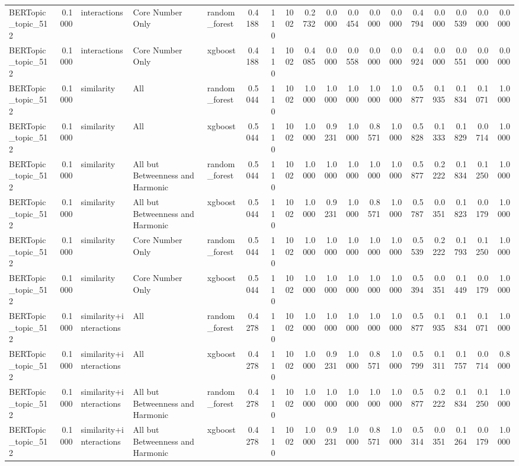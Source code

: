 \begin{tabular}{lrlllrrrrrrrrrrrrr}
BERTopic_topic_512 & 0.1000 & interactions & Core Number Only & random_forest & 0.4188 & 110 & 1002 & 0.2732 & 0.0000 & 0.0454 & 0.0000 & 0.0000 & 0.4794 & 0.0000 & 0.0539 & 0.0000 & 0.0000 \\
BERTopic_topic_512 & 0.1000 & interactions & Core Number Only & xgboost & 0.4188 & 110 & 1002 & 0.4085 & 0.0000 & 0.0558 & 0.0000 & 0.0000 & 0.4924 & 0.0000 & 0.0551 & 0.0000 & 0.0000 \\
BERTopic_topic_512 & 0.1000 & similarity & All & random_forest & 0.5044 & 110 & 1002 & 1.0000 & 1.0000 & 1.0000 & 1.0000 & 1.0000 & 0.5877 & 0.1935 & 0.1834 & 0.1071 & 1.0000 \\
BERTopic_topic_512 & 0.1000 & similarity & All & xgboost & 0.5044 & 110 & 1002 & 1.0000 & 0.9231 & 1.0000 & 0.8571 & 1.0000 & 0.5828 & 0.1333 & 0.1829 & 0.0714 & 1.0000 \\
BERTopic_topic_512 & 0.1000 & similarity & All but Betweenness and Harmonic & random_forest & 0.5044 & 110 & 1002 & 1.0000 & 1.0000 & 1.0000 & 1.0000 & 1.0000 & 0.5877 & 0.2222 & 0.1834 & 0.1250 & 1.0000 \\
BERTopic_topic_512 & 0.1000 & similarity & All but Betweenness and Harmonic & xgboost & 0.5044 & 110 & 1002 & 1.0000 & 0.9231 & 1.0000 & 0.8571 & 1.0000 & 0.5787 & 0.0351 & 0.1823 & 0.0179 & 1.0000 \\
BERTopic_topic_512 & 0.1000 & similarity & Core Number Only & random_forest & 0.5044 & 110 & 1002 & 1.0000 & 1.0000 & 1.0000 & 1.0000 & 1.0000 & 0.5539 & 0.2222 & 0.1793 & 0.1250 & 1.0000 \\
BERTopic_topic_512 & 0.1000 & similarity & Core Number Only & xgboost & 0.5044 & 110 & 1002 & 1.0000 & 1.0000 & 1.0000 & 1.0000 & 1.0000 & 0.5394 & 0.0351 & 0.1449 & 0.0179 & 1.0000 \\
BERTopic_topic_512 & 0.1000 & similarity+interactions & All & random_forest & 0.4278 & 110 & 1002 & 1.0000 & 1.0000 & 1.0000 & 1.0000 & 1.0000 & 0.5877 & 0.1935 & 0.1834 & 0.1071 & 1.0000 \\
BERTopic_topic_512 & 0.1000 & similarity+interactions & All & xgboost & 0.4278 & 110 & 1002 & 1.0000 & 0.9231 & 1.0000 & 0.8571 & 1.0000 & 0.5799 & 0.1311 & 0.1757 & 0.0714 & 0.8000 \\
BERTopic_topic_512 & 0.1000 & similarity+interactions & All but Betweenness and Harmonic & random_forest & 0.4278 & 110 & 1002 & 1.0000 & 1.0000 & 1.0000 & 1.0000 & 1.0000 & 0.5877 & 0.2222 & 0.1834 & 0.1250 & 1.0000 \\
BERTopic_topic_512 & 0.1000 & similarity+interactions & All but Betweenness and Harmonic & xgboost & 0.4278 & 110 & 1002 & 1.0000 & 0.9231 & 1.0000 & 0.8571 & 1.0000 & 0.5314 & 0.0351 & 0.1264 & 0.0179 & 1.0000 \\

\end{tabular}
